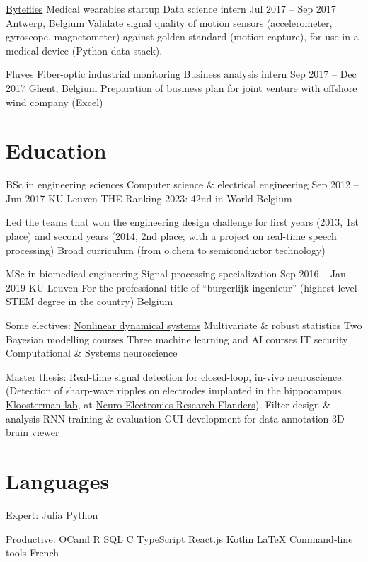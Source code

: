 \documentclass[a4]{article}
\begin{document}
\href{https://byteflies.com}{Byteflies}
Medical wearables startup
Data science intern
Jul 2017  –  Sep 2017
Antwerp, Belgium
Validate signal quality of motion sensors (accelerometer, gyroscope, magnetometer) against golden standard (motion capture), for use in a medical device (Python data stack).

\href{https://www.fluves.com}{Fluves}
Fiber-optic industrial monitoring
Business analysis intern
Sep 2017  –  Dec 2017
Ghent, Belgium
Preparation of business plan for joint venture with offshore wind company (Excel)



\section{Education}


BSc in engineering sciences
Computer science \& electrical engineering
Sep 2012  –  Jun 2017
KU Leuven
THE Ranking 2023: 42nd in World
Belgium

Led the teams that won the engineering design challenge for first years (2013, 1st place) and second years (2014, 2nd place; with a project on real-time speech processing)
Broad curriculum (from o.chem to semiconductor technology)


MSc in biomedical engineering
Signal processing specialization
Sep 2016  –  Jan 2019
KU Leuven
For the professional title of “burgerlijk ingenieur”  (highest-level STEM degree in the country)
Belgium

Some electives:
\href{https://github.com/tfiers/strogatz#readme}{Nonlinear dynamical systems}
Multivariate \& robust statistics
Two Bayesian modelling  courses
Three machine learning and AI courses
IT security
Computational \& Systems neuroscience

Master thesis:  Real-time signal detection for closed-loop, in-vivo neuroscience. (Detection of sharp-wave ripples on electrodes implanted in the hippocampus, \href{https://www.nerf.be/research/nerf-labs/fabian-kloosterman}{Kloosterman lab}, at \href{https://www.nerf.be}{Neuro-Electronics Research Flanders}).
Filter design \& analysis
RNN training \& evaluation
GUI development for data annotation
3D brain viewer


\section{Languages}

Expert:
Julia
Python

Productive:
OCaml
R
SQL
C
TypeScript
React.js
Kotlin
LaTeX
Command-line tools
French
\end{document}
